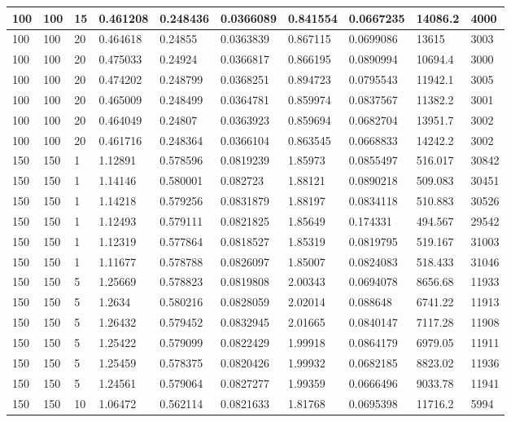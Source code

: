 \begin{landscape}
\begin{longtable}{ | l | l | l | l | l | l | l | l | l | l | }
100 & 100 & 15 & 0.461208 & 0.248436 & 0.0366089 & 0.841554 & 0.0667235 & 14086.2 & 4000\\ \hline
100 & 100 & 20 & 0.464618 & 0.24855 & 0.0363839 & 0.867115 & 0.0699086 & 13615 & 3003\\ \hline
100 & 100 & 20 & 0.475033 & 0.24924 & 0.0366817 & 0.866195 & 0.0890994 & 10694.4 & 3000\\ \hline
100 & 100 & 20 & 0.474202 & 0.248799 & 0.0368251 & 0.894723 & 0.0795543 & 11942.1 & 3005\\ \hline
100 & 100 & 20 & 0.465009 & 0.248499 & 0.0364781 & 0.859974 & 0.0837567 & 11382.2 & 3001\\ \hline
100 & 100 & 20 & 0.464049 & 0.24807 & 0.0363923 & 0.859694 & 0.0682704 & 13951.7 & 3002\\ \hline
100 & 100 & 20 & 0.461716 & 0.248364 & 0.0366104 & 0.863545 & 0.0668833 & 14242.2 & 3002\\ \hline
150 & 150 & 1 & 1.12891 & 0.578596 & 0.0819239 & 1.85973 & 0.0855497 & 516.017 & 30842\\ \hline
150 & 150 & 1 & 1.14146 & 0.580001 & 0.082723 & 1.88121 & 0.0890218 & 509.083 & 30451\\ \hline
150 & 150 & 1 & 1.14218 & 0.579256 & 0.0831879 & 1.88197 & 0.0834118 & 510.883 & 30526\\ \hline
150 & 150 & 1 & 1.12493 & 0.579111 & 0.0821825 & 1.85649 & 0.174331 & 494.567 & 29542\\ \hline
150 & 150 & 1 & 1.12319 & 0.577864 & 0.0818527 & 1.85319 & 0.0819795 & 519.167 & 31003\\ \hline
150 & 150 & 1 & 1.11677 & 0.578788 & 0.0826097 & 1.85007 & 0.0824083 & 518.433 & 31046\\ \hline
150 & 150 & 5 & 1.25669 & 0.578823 & 0.0819808 & 2.00343 & 0.0694078 & 8656.68 & 11933\\ \hline
150 & 150 & 5 & 1.2634 & 0.580216 & 0.0828059 & 2.02014 & 0.088648 & 6741.22 & 11913\\ \hline
150 & 150 & 5 & 1.26432 & 0.579452 & 0.0832945 & 2.01665 & 0.0840147 & 7117.28 & 11908\\ \hline
150 & 150 & 5 & 1.25422 & 0.579099 & 0.0822429 & 1.99918 & 0.0864179 & 6979.05 & 11911\\ \hline
150 & 150 & 5 & 1.25459 & 0.578375 & 0.0820426 & 1.99932 & 0.0682185 & 8823.02 & 11936\\ \hline
150 & 150 & 5 & 1.24561 & 0.579064 & 0.0827277 & 1.99359 & 0.0666496 & 9033.78 & 11941\\ \hline
150 & 150 & 10 & 1.06472 & 0.562114 & 0.0821633 & 1.81768 & 0.0695398 & 11716.2 & 5994\\ \hline

\end{longtable}
\end{landscape}
